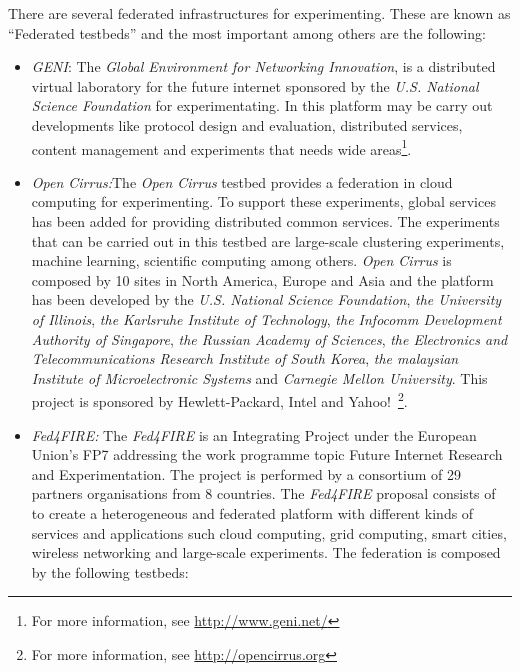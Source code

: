 There are several federated infrastructures for experimenting. These are known
as ``Federated testbeds'' and the most important among others are the following:
\begin{itemize}
\item \emph{GENI}: The \emph{Global Environment for Networking Innovation}, is a distributed virtual
laboratory for the future internet sponsored by the \emph{U.S. National Science Foundation} for
experimentating. In this platform may be carry out developments like protocol
design and evaluation, distributed services, content management and experiments
that needs wide areas\footnote{For more information, see
  \url{http://www.geni.net/}}.
\item \emph{Open
  Cirrus:}The \emph{Open Cirrus} testbed provides a federation in cloud computing for
experimenting. To support these experiments, global services has been added for
providing distributed common services. The experiments that can be carried out
in this testbed are large-scale clustering experiments, machine learning,
scientific computing among others. \emph{Open Cirrus} is composed by 10 sites in North
America, Europe and Asia and the platform has been developed by the
\emph{U.S. National Science Foundation}, \emph{the University of
  Illinois},\emph{ the Karlsruhe Institute of Technology}, \emph{the Infocomm Development Authority of Singapore},\emph{ the
Russian Academy of Sciences}, \emph{the Electronics and Telecommunications Research
Institute of South Korea}, \emph{the malaysian Institute of Microelectronic
  Systems} and \emph{Carnegie Mellon University}. This project is sponsored by Hewlett-Packard, Intel
and Yahoo!~\footnote{For more information, see \url{http://opencirrus.org}}.

\item \emph{Fed4FIRE:} The \emph{Fed4FIRE} is an Integrating Project under the European
Union's \ac{FP7} addressing the work programme topic Future Internet Research
and Experimentation. The project is performed by a consortium of 29 partners
organisations from 8 countries. The \emph{Fed4FIRE}  proposal consists of to create a
heterogeneous and federated platform with different kinds of services and applications such
cloud computing, grid computing, smart cities, wireless networking and
large-scale experiments. The federation is composed by the following testbeds:


\end{itemize}
